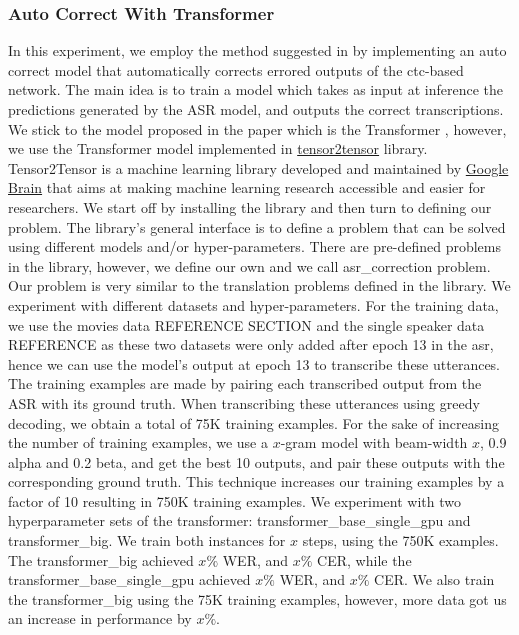 \subsubsection{Auto Correct With Transformer}

In this experiment, we employ the method suggested in \cite{zhang2019automatic} by implementing an auto correct model that automatically corrects errored outputs of the ctc-based network. The main idea is to train a model which takes as input at inference the predictions generated by the \ac{ASR} model, and outputs the correct transcriptions. We stick to the model proposed in the paper \cite{zhang2019automatic} which is the Transformer \cite{vaswani2017attention}, however, we use the Transformer model implemented in \href{https://github.com/tensorflow/tensor2tensor}{tensor2tensor} library. \ac{Tensor2Tensor} is a machine learning library developed and maintained by \href{https://ai.google/research/teams/brain}{Google Brain} that aims at making machine learning research accessible and easier for researchers.
We start off by installing the library and then turn to defining our problem. The library's general interface is to define a problem that can be solved using different models and/or hyper-parameters. There are pre-defined problems in the library, however, we define our own and we call asr\_correction problem. Our problem is very similar to the translation problems defined in the library. We experiment with different datasets and hyper-parameters. For the training data, we use the movies data REFERENCE SECTION and the single speaker data REFERENCE as these two datasets were only added after epoch 13 in the asr, hence we can use the model's output at epoch 13 to transcribe these utterances. The training examples are made by pairing each transcribed output from the \ac{ASR} with its ground truth. When transcribing these utterances using greedy decoding, we obtain a total of 75K training examples.  For the sake of increasing the number of training examples, we use a $x$-gram model with beam-width $x$, 0.9 alpha and 0.2 beta, and get the best 10 outputs, and pair these outputs with the corresponding ground truth. This technique increases our training examples by a factor of 10 resulting in 750K training examples. We experiment with two hyperparameter sets of the transformer: transformer\_base\_single\_gpu and transformer\_big. We train both instances for $x$ steps, using the 750K examples. The transformer\_big achieved $x\%$ \ac{WER}, and $x\%$ \ac{CER}, while the transformer\_base\_single\_gpu  achieved $x\%$ \ac{WER}, and $x\%$ \ac{CER}. We also train the transformer\_big using the 75K training examples, however, more data got us an increase in performance by $x\%$.



